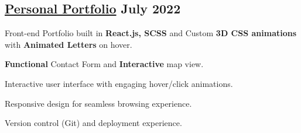 \subsection{{\href{https://nidhikumari.vercel.app/}{Personal Portfolio} \hfill July 2022}}
\begin{zitemize}
\item Front-end Portfolio built in \textbf{React.js, SCSS} and Custom \textbf{3D CSS animations} with  \textbf{Animated Letters }on hover.
\item \textbf{Functional} Contact Form and \textbf{Interactive} map view.
\item Interactive user interface with engaging hover/click animations.
\item Responsive design for seamless browsing experience.
\item Version control (Git) and deployment experience.
\end{zitemize}
